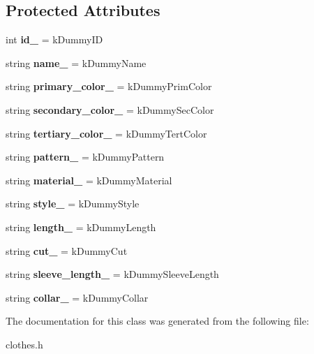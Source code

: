 \subsection*{Protected Attributes}
\begin{DoxyCompactItemize}
\item 
\mbox{\label{classClothes_a8978d931db5ca47c3ccea30def4ae83e}} 
int {\bfseries id\+\_\+} = k\+Dummy\+ID
\item 
\mbox{\label{classClothes_a7f2275aaae24224d60c48af922c31b65}} 
string {\bfseries name\+\_\+} = k\+Dummy\+Name
\item 
\mbox{\label{classClothes_a7cb005bf6cbb7f4eaa40f1b31817559c}} 
string {\bfseries primary\+\_\+color\+\_\+} = k\+Dummy\+Prim\+Color
\item 
\mbox{\label{classClothes_ab8f55f67b956b25d71260cffcf273673}} 
string {\bfseries secondary\+\_\+color\+\_\+} = k\+Dummy\+Sec\+Color
\item 
\mbox{\label{classClothes_a3c5f1e7ab531e3ba7a38b930da8078a0}} 
string {\bfseries tertiary\+\_\+color\+\_\+} = k\+Dummy\+Tert\+Color
\item 
\mbox{\label{classClothes_a1d40145a4eb6d28441f112f030ab5d35}} 
string {\bfseries pattern\+\_\+} = k\+Dummy\+Pattern
\item 
\mbox{\label{classClothes_adbb9ed311f14ccbb1e4fe0e8378a95d4}} 
string {\bfseries material\+\_\+} = k\+Dummy\+Material
\item 
\mbox{\label{classClothes_aa85ed2b95110d8c477a1aca9cb403f98}} 
string {\bfseries style\+\_\+} = k\+Dummy\+Style
\item 
\mbox{\label{classClothes_ae02603eda727e33caf46ec30e761e3c3}} 
string {\bfseries length\+\_\+} = k\+Dummy\+Length
\item 
\mbox{\label{classClothes_ac1c2286c8928a5eee91d818a098a44ac}} 
string {\bfseries cut\+\_\+} = k\+Dummy\+Cut
\item 
\mbox{\label{classClothes_a012aeb71e62ebaf9b5b5dd700cc8d5db}} 
string {\bfseries sleeve\+\_\+length\+\_\+} = k\+Dummy\+Sleeve\+Length
\item 
\mbox{\label{classClothes_ae2e5026257b3a2f2ddbf61757fd3b57b}} 
string {\bfseries collar\+\_\+} = k\+Dummy\+Collar
\end{DoxyCompactItemize}


The documentation for this class was generated from the following file\+:\begin{DoxyCompactItemize}
\item 
clothes.\+h\end{DoxyCompactItemize}

